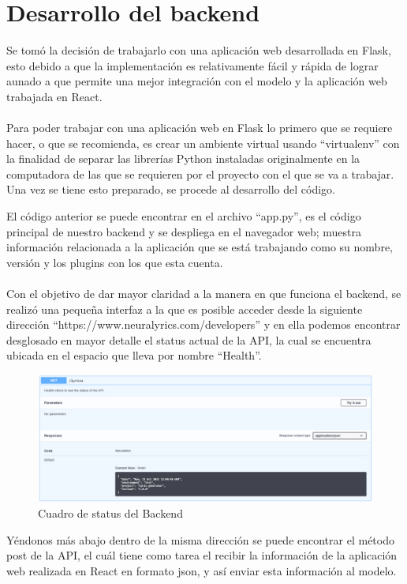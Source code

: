 \documentclass[12pt, a4paper, titlepage]{article}
\begin{document}
	\section{Desarrollo del backend}
	Se tomó la decisión de trabajarlo con una aplicación web desarrollada en Flask, esto debido a que la implementación es relativamente fácil y rápida de lograr aunado a que permite una mejor integración con el modelo y la aplicación web trabajada en React.\\\\
	Para poder trabajar con una aplicación web en Flask lo primero que se requiere hacer, o que se recomienda, es crear un ambiente virtual usando “virtualenv” con la finalidad de separar las librerías Python instaladas originalmente en la computadora de las que se requieren por el proyecto con el que se va a trabajar. Una vez se tiene esto preparado, se procede al desarrollo del código.
	\begin{center}
		
	\end{center}
	El código anterior se puede encontrar en el archivo “app.py”, es el código principal de nuestro backend y se despliega en el navegador web; muestra información relacionada a la aplicación que se está trabajando como su nombre, versión y los plugins con los que esta cuenta.\\\\
	Con el objetivo de dar mayor claridad a la manera en que funciona el backend, se realizó una pequeña interfaz a la que es posible acceder desde la siguiente dirección “https://www.neuralyrics.com/developers” y en ella podemos encontrar desglosado en mayor detalle el status actual de la API, la cual se encuentra ubicada en el espacio que lleva por nombre “Health”.
	\begin{figure}[H]
		\includegraphics[width=13.5cm]{./Imagenes/BackEnd/Health.png}
		\centering 
		\caption{Cuadro de status del Backend}
	\end{figure}
	Yéndonos más abajo dentro de la misma dirección se puede encontrar el método post de la API, el cuál tiene como tarea el recibir la información de la aplicación web realizada en React en formato json, y así enviar esta información al modelo.
\end{document}
